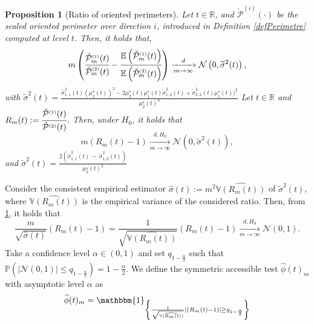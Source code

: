 \documentclass[12pt]{article}
\renewcommand{\tilde}{\widetilde}
\renewcommand{\hat}{\widehat}
\theoremstyle{Theorem}
\newtheorem{Proposition}[Theorem]{Proposition}
\begin{document}
\begin{Proposition}[Ratio of oriented perimeters]\label{deltamethodgeneralprop} 
Let  $t \in \mathbb{R}$, and $\check{\mathcal{P}}^{\scriptscriptstyle  (i) }(\cdot)$ be the scaled oriented perimeter over direction $i$, introduced in Definition \ref{defPerimetre} computed at level $t$. Then, it holds that,
\begin{equation*}
m\left(\cfrac{\check{\mathcal{P}}^{\scriptscriptstyle  (1) }_{m}(t)}{\check{\mathcal{P}}^{\scriptscriptstyle  (2)}_{m}(t)} - \cfrac{\mathbb{E}\left(\check{\mathcal{P}}^{\scriptscriptstyle  (1) }_{m}(t)\right)}{\mathbb{E}\left(\check{\mathcal{P}}^{\scriptscriptstyle  (2)}_{m}(t)\right)} \right)  \xrightarrow[m \to \infty]{d} \mathcal{N}\left(0,  \tilde{\sigma}^{2}(t) \right),
\end{equation*}
with $\tilde{\sigma}^{2}(t) = \frac{\tilde{\sigma}_{\scriptscriptstyle 1,1}^{2}(t)(\mu^{\star}_{2}(t))^{2} - 2\mu^{\star}_{2}(t)\mu^{\star}_{1}(t)\tilde{\sigma}_{\scriptscriptstyle 1,2}^{2}(t) +\tilde{\sigma}_{\scriptscriptstyle 2,2}^{2}(t)\mu^{\star}_{1}(t))^{2}}{\mu^{\star}_{2}(t)^4}$
Let $t \in \mathbb{R}$  and  $R_{m}(t) := \cfrac{\check{\mathcal{P}}^{\scriptscriptstyle  (1) }(t)}{\check{\mathcal{P}}^{\scriptscriptstyle  (2) }(t)}$. Then, under $H_{0}$, it holds that
\begin{equation}\label{ratiounderH0}
m\left(R_{m}(t) - 1 \right)  \xrightarrow[m \to \infty]{d, H_0} \mathcal{N}\left(0,  \tilde{\sigma}^{2}(t)  \right),
\end{equation}
and $\tilde{\sigma}^{2}(t) = \frac{2\left(\tilde{\sigma}_{\scriptscriptstyle 1,1}^{2}(t) \, - \, \tilde{\sigma}_{\scriptscriptstyle 1,2}^{2}(t)\right)}{\mu^{\star}_{2}(t)^2}$
\end{Proposition}
Consider the consistent empirical estimator $\hat{\sigma}(t):= m^{2}\hat{\mathbb{V}\left(R_{m}(t)\right)}$ of $\tilde{\sigma}^{2}(t)$, where $\hat{\mathbb{V}\left(R_{m}(t)\right)}$ is the empirical variance of the considered ratio. Then, from \ref{deltamethodgeneralprop}, it holds that 
$$ \frac{m}{\sqrt{\hat{\sigma}(t)}}\left(R_{m}(t) - 1 \right) = \frac{1}{\sqrt{\hat{\mathbb{V}\left(R_{m}(t)\right)}}}\left(R_{m}(t) - 1 \right)   \xrightarrow[m \to \infty]{d, H_{0}} \mathcal{N}\left(0, 1 \right).$$
Take a confidence level $\alpha \in (0,1)$ and set $q_{1-\frac{\alpha}{2}}$ such that $\mathbb{P}\left(|\mathcal{N}\left(0,1\right)| \leq  q_{1-\frac{\alpha}{2}} \right) = 1 - \frac{\alpha}{2}$. We define the symmetric accessible test $\hat{\phi}(t)_{m}$ with asymptotic level $\alpha$ as 
\begin{equation}
\label{phihat}
\hat{\phi}(t)_{m}= \mathbbm{1}_{\left\{ \frac{1}{\sqrt{\hat{\mathbb{V}\left(R_{m}(t)\right)}}}\left|\left(R_{m}(t) - 1 \right)\right| \geq q_{1- \frac{\alpha}{2}} \right\}}
\end{equation}
\end{document}
